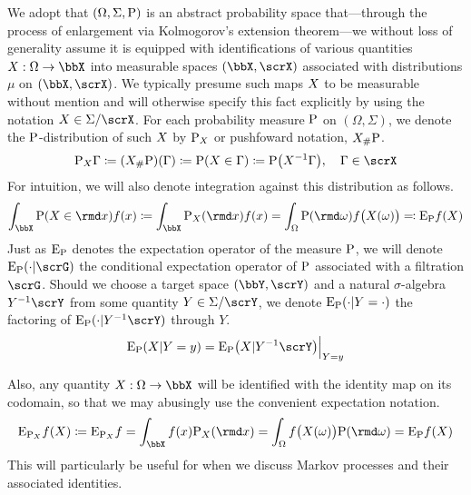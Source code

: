We adopt that $(\Omega, \Sigma, {\operatorname{P}})$ is an abstract probability space that---through the process of enlargement via Kolmogorov's extension theorem---we without loss of generality assume it is equipped with identifications of various quantities $\X: \Omega \rightarrow \stateSpace$ into measurable spaces $(\stateSpace, \stateAlg)$ associated with distributions $\mu$ on $(\stateSpace, \stateAlg)$.
We typically presume such maps $X$ to be measurable without mention and will otherwise specify this fact explicitly by using the notation $\X \in \Sigma/\stateAlg$.
For each probability measure ${\operatorname{P}}$ on $(\Omega, \Sigma)$, we denote the ${\operatorname{P}}$-distribution of such $X$ by ${\operatorname{P}}_X$ or pushfoward notation, ${{X}_\#{{\operatorname{P}}}}$.
\begin{equation*}
  \Prb_\X\Gamma \defeq (\push{\Prb}{\X})(\Gamma) \defeq \Prb(\X \in \Gamma) \defeq \Prb\big(X^{-1}\Gamma\big), \quad \Gamma \in \stateAlg
\end{equation*}
For intuition, we will also denote integration against this distribution as follows.
\begin{equation*}
  \int_\stateSpace \Prb(\X \in \rmd\stateVar)f(\stateVar)  \defeq \int_\stateSpace \Prb_\X(\rmd\stateVar) f(\stateVar) = \int_\Omega \Prb(\rmd\omega) f\big(\X(\omega)\big) \eqdef \Exp_\Prb f(\X)
\end{equation*}
Just as ${\operatorname{E}}_{\operatorname{P}}$ denotes the expectation operator of the measure ${\operatorname{P}}$, we will denote $\Exp_\Prb(\cdot|\scrG)$ the conditional expectation operator of ${\operatorname{P}}$ associated with a filtration $\scrG$.
Should we choose a target space $(\bbY, \scrY)$ and a natural $\sigma$-algebra $Y^{-1}\scrY$ from some quantity $Y \in \Sigma/\scrY$, we denote ${\operatorname{E}}_{\operatorname{P}}(\cdot|Y=\cdot)$ the factoring of $\Exp_\Prb(\cdot|Y^{-1}\scrY)$ through $Y$.
\begin{equation*}
  \Exp_\Prb(\X | Y=y) = \Exp_\Prb\big(\X | Y^{-1}\scrY \big) \Big|_{Y=y}
\end{equation*}

Also, any quantity $\X: \Omega \rightarrow \stateSpace$ will be identified with the identity map on its codomain, so that we may abusingly use the convenient expectation notation.
\begin{equation*}
  \Exp_{\Prb_\X} f(\X) \defeq \Exp_{\Prb_\X} f = \int_\stateSpace f(\stateVar) \Prb_\X(\rmd\stateVar) = \int_\Omega f\big(\X(\omega)\big) \Prb(\rmd\omega) = \Exp_\Prb f(\X)
\end{equation*}
This will particularly be useful for when we discuss Markov processes and their associated identities.
